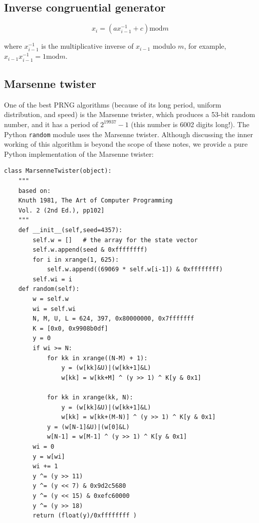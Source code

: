 \documentclass[justified,sixbynine]{tufte-book}
\def\ft{\small\tt}
\theoremstyle{plain}%
\theoremstyle{definition}
\theoremstyle{remark}
\begin{document}
\begin{fullwidth}
\goodbreak\subsection{Inverse congruential generator}

\begin{equation}
x_i=(ax_{i-1}^{-1}+c)\textrm{mod}m
\end{equation}

where $x_{i-1}^{-1}$ is the multiplicative inverse of $x_{i-1}$ modulo $m$,
for example, $x_{i-1}x_{i-1}^{-1}=1\textrm{mod}m$.


\goodbreak\subsection{Marsenne twister}

One of the best PRNG algorithms (because of its long period, uniform distribution, and speed) is the Marsenne twister, which produces a 53-bit random number,
and it has a period of $2^{19937}-1$ (this number is 6002 digits long!).
The Python {\ft random} module uses the Marsenne twister.
Although discussing the inner working of this algorithm is beyond the scope of these notes, we provide a
pure Python implementation of the Marsenne twister:


\begin{lstlisting}[caption={in file: {\ft nlib.py}}]
class MarsenneTwister(object):
    """
    based on:
    Knuth 1981, The Art of Computer Programming
    Vol. 2 (2nd Ed.), pp102]
    """
    def __init__(self,seed=4357):
        self.w = []   # the array for the state vector
        self.w.append(seed & 0xffffffff)
        for i in xrange(1, 625):
            self.w.append((69069 * self.w[i-1]) & 0xffffffff)
        self.wi = i
    def random(self):
        w = self.w
        wi = self.wi
        N, M, U, L = 624, 397, 0x80000000, 0x7fffffff
        K = [0x0, 0x9908b0df]
        y = 0
        if wi >= N:
            for kk in xrange((N-M) + 1):
                y = (w[kk]&U)|(w[kk+1]&L)
                w[kk] = w[kk+M] ^ (y >> 1) ^ K[y & 0x1]

            for kk in xrange(kk, N):
                y = (w[kk]&U)|(w[kk+1]&L)
                w[kk] = w[kk+(M-N)] ^ (y >> 1) ^ K[y & 0x1]
            y = (w[N-1]&U)|(w[0]&L)
            w[N-1] = w[M-1] ^ (y >> 1) ^ K[y & 0x1]
        wi = 0
        y = w[wi]
        wi += 1
        y ^= (y >> 11)
        y ^= (y << 7) & 0x9d2c5680
        y ^= (y << 15) & 0xefc60000
        y ^= (y >> 18)
        return (float(y)/0xffffffff )
\end{lstlisting}


\end{fullwidth}
\end{document}
